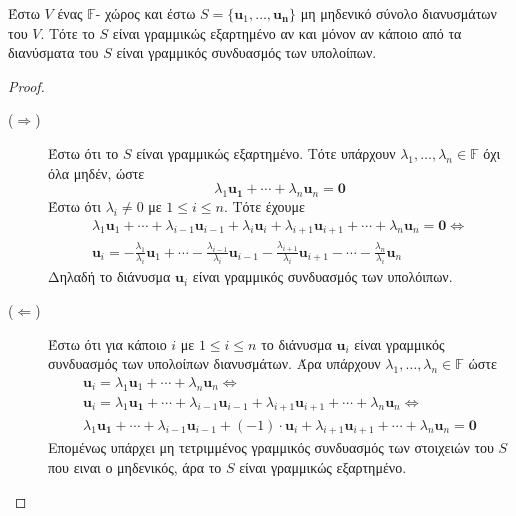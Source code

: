 \documentclass[a4paper,table]{report}
\begin{document}
\begin{thm}\label{thm:s1s2depend}
  Έστω $V$ ένας $ \mathbb{F} $- χώρος και έστω 
  $ S = \{ \mathbf{u}_{1}, \ldots, \mathbf{u_{n}} \} $ μη μηδενικό σύνολο 
  διανυσμάτων του $V$. Τότε το $S$ είναι γραμμικώς εξαρτημένο αν και μόνον αν 
  κάποιο από τα διανύσματα του $S$ είναι γραμμικός συνδυασμός των υπολοίπων. 
\end{thm}
\begin{proof}
\item {}
  \begin{description}
    \item [($ \Rightarrow $)] Έστω ότι το $S$ είναι γραμμικώς εξαρτημένο. Τότε 
      υπάρχουν $ \lambda _{1}, \ldots, \lambda_{n} \in \mathbb{F} $ όχι 
      όλα μηδέν, ώστε 
      \[
        \lambda _{1} \mathbf{u_{1}} + \cdots + \lambda _{n} \mathbf{u}_{n} = 
        \mathbf{0}  
      \] 
      Έστω ότι $ \lambda _{i} \neq 0 $ με $ 1 \leq i \leq n $. Τότε έχουμε
      \begin{align*}
        \lambda _{1} \mathbf{u}_{1} + \cdots + \lambda _{i-1} 
        \mathbf{u}_{i-1} + \lambda _{i} \mathbf{u}_{i} + \lambda _{i+1} 
        \mathbf{u}_{i+1} + \cdots + \lambda _{n}
        \mathbf{u}_{n} = \mathbf{0} \Leftrightarrow  \\
        \mathbf{u}_{i} = - \frac{\lambda _{1}}{\lambda _{i}} \mathbf{u}_{1} +
        \cdots - \frac{\lambda _{i-1}}{\lambda _{i}} \mathbf{u}_{i-1} - 
        \frac{\lambda _{i+1}}{\lambda _{i}} \mathbf{u}_{i+1} - 
        \cdots - \frac{\lambda _{n}}{\lambda _{i}} \mathbf{u}_{n} 
      \end{align*} 
      Δηλαδή το διάνυσμα $ \mathbf{u}_{i} $ είναι γραμμικός συνδυασμός των 
      υπολόιπων.
    \item [($\Leftarrow$)] 
      Έστω ότι για κάποιο $ i $ με $ 1 \leq i \leq n $ το διάνυσμα 
      $ \mathbf{u}_{i} $ είναι γραμμικός συνδυασμός των υπολοίπων διανυσμάτων.
      Άρα υπάρχουν $ \lambda _{1}, \ldots, \lambda _{n} \in \mathbb{F} $ 
      ώστε 
      \begin{gather*}
        \mathbf{u}_{i} = \lambda _{1} \mathbf{u}_{1} + \cdots + 
        \lambda _{n} \mathbf{u}_{n} \Leftrightarrow \\
        \mathbf{u}_{i} = \lambda _{1} \mathbf{u_{1}} + \cdots + 
        \lambda _{i-1}
        \mathbf{u}_{i-1} + \lambda _{i+1} \mathbf{u}_{i+1} + \cdots + 
        \lambda _{n} \mathbf{u}_{n} \Leftrightarrow \\
        \lambda _{1} \mathbf{u_{1}} + \cdots + \lambda _{i-1}
        \mathbf{u}_{i-1} + (-1) \cdot \mathbf{u}_{i} + \lambda _{i+1} 
        \mathbf{u}_{i+1} + \cdots + \lambda _{n} \mathbf{u}_{n} = \mathbf{0}
      \end{gather*}
      Επομένως υπάρχει μη τετριμμένος γραμμικός συνδυασμός των στοιχειών του 
      $S$ που ειναι ο μηδενικός, άρα το $S$ είναι γραμμικώς εξαρτημένο.
  \end{description}
\end{proof}
\end{document}
